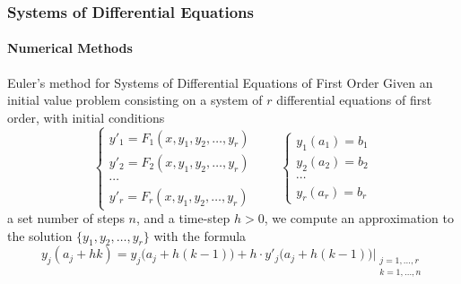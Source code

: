 \documentclass[9pt,xcolor=x11names,compress]{beamer}
\begin{document}
\begin{frame}\frametitle{Systems of Differential Equations}
\framesubtitle{Numerical Methods}
\begin{block}
	{Euler's method for Systems of Differential Equations of First Order}
	Given an initial value problem consisting on a system of $r$ differential equations of first order, with initial conditions
	\begin{equation*}
		\begin{cases}
			y'_1=F_1(x,y_1,y_2,\dotsc,y_r) \\
			y'_2=F_2(x,y_1,y_2,\dotsc,y_r) \\
			\dotsb \\
			y'_r=F_r(x,y_1,y_2,\dotsc,y_r)
		\end{cases}\qquad
	\begin{cases}
		y_1(a_1)=b_1\\ y_2(a_2)=b_2\\ \dotsb \\ y_r(a_r)=b_r
	\end{cases}
	\end{equation*}
	a set number of steps $n$, and a time-step $h>0$, we compute an approximation to the solution $\{y_1,y_2,\dotsc,y_r\}$ with the formula
	\begin{equation*}
		y_j(a_j+hk)=y_j\big( a_j+h(k-1) \big)+h \cdot y'_j\big(a_j+h(k-1)\big) \bigg\rvert_{\substack{j=1,\dotsc,r \\ k=1,\dotsc,n}}
	\end{equation*}
\end{block}
\end{frame}
\end{document}
